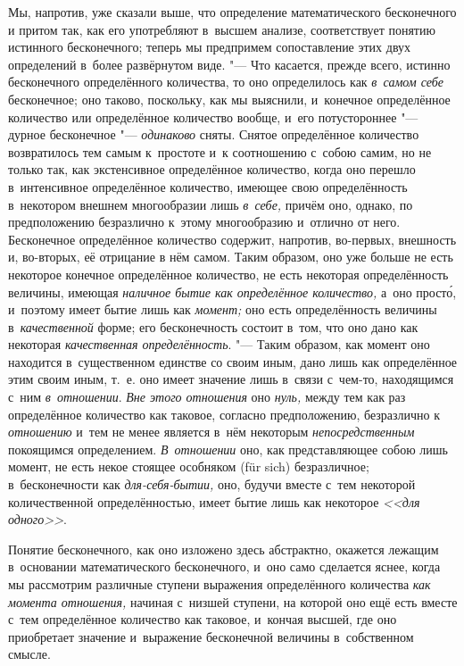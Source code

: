Мы, напротив, уже сказали выше, что определение математического бесконечного и
притом так, как его употребляют в~высшем анализе, соответствует понятию
истинного бесконечного; теперь мы предпримем сопоставление этих двух
определений в~более развёрнутом виде. "--- Что касается, прежде всего, истинно
бесконечного определённого количества, то оно определилось как {\em в~самом
себе} бесконечное; оно таково, поскольку, как мы выяснили, и~конечное
определённое количество или определённое количество вообще, и~его потустороннее
"--- дурное бесконечное "--- {\em одинаково} сняты. Снятое определённое количество
возвратилось тем самым к~простоте и~к соотношению с~собою самим, но не только
так, как экстенсивное определённое количество, когда оно перешло в~интенсивное
определённое количество, имеющее свою определённость в~некотором внешнем
многообразии лишь {\em в~себе,} причём оно, однако, по предположению
безразлично к~этому многообразию и~отлично от него. Бесконечное определённое
количество содержит, напротив, во-первых, внешность и, во-вторых, её отрицание
в нём самом. Таким образом, оно уже больше не есть некоторое конечное
определённое количество, не есть некоторая определённость величины, имеющая
{\em наличное бытие как определённое количество,} а~оно прост\'{о}, и~поэтому имеет
бытие лишь как {\em момент;} оно есть определённость величины
в~{\em качественной} форме; его бесконечность состоит в~том, что оно дано как
некоторая {\em качественная определённость}. "--- Таким образом, как момент оно
находится в~существенном единстве со своим иным, дано лишь как
определённое этим своим иным, т.~е. оно имеет значение лишь в~связи
с~чем-то, находящимся с~ним {\em в~отношении}. {\em Вне этого отношения} оно
{\em нуль,} между тем как раз определённое количество как таковое, согласно
предположению, безразлично к {\em отношению} и~тем не менее является в~нём
некоторым {\em непосредственным} покоящимся определением. {\em В~отношении}
оно, как представляющее собою лишь момент, не есть некое стоящее особняком
(für sich) безразличное; в~бесконечности как {\em для-себя-бытии,} оно, будучи
вместе с~тем некоторой количественной определённостью, имеет бытие лишь как
некоторое {\em <<для одного>>}.

Понятие бесконечного, как оно изложено здесь абстрактно, окажется лежащим
в~основании математического бесконечного, и~оно само сделается яснее, когда
мы рассмотрим различные ступени выражения определённого количества
{\em как момента отношения,} начиная с~низшей ступени, на которой оно ещё есть
вместе с~тем определённое количество как таковое, и~кончая высшей, где оно
приобретает значение и~выражение бесконечной величины в~собственном смысле.

